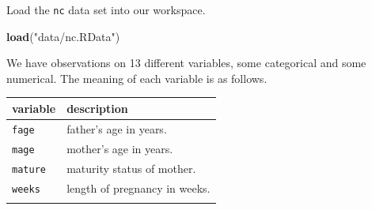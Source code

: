\documentclass[]{book}
\newenvironment{Shaded}{\begin{snugshade}}{\end{snugshade}}
\newcommand{\KeywordTok}[1]{\textcolor[rgb]{0.13,0.29,0.53}{\textbf{{#1}}}}
\newcommand{\StringTok}[1]{\textcolor[rgb]{0.31,0.60,0.02}{{#1}}}
\newcommand{\NormalTok}[1]{{#1}}
\theoremstyle{definition}
\theoremstyle{definition}
\theoremstyle{remark}
\begin{document}
Load the \texttt{nc} data set into our workspace.

\begin{Shaded}
\begin{Highlighting}[]
\KeywordTok{load}\NormalTok{(}\StringTok{"data/nc.RData"}\NormalTok{)}
\end{Highlighting}
\end{Shaded}

We have observations on 13 different variables, some categorical and
some numerical. The meaning of each variable is as follows.

\begin{longtable}[]{@{}ll@{}}
\toprule
\begin{minipage}[b]{0.22\columnwidth}\raggedright\strut
variable\strut
\end{minipage} & \begin{minipage}[b]{0.16\columnwidth}\raggedright\strut
description\strut
\end{minipage}\tabularnewline
\midrule
\endhead
\begin{minipage}[t]{0.22\columnwidth}\raggedright\strut
\texttt{fage}\strut
\end{minipage} & \begin{minipage}[t]{0.16\columnwidth}\raggedright\strut
father's age in years.\strut
\end{minipage}\tabularnewline
\begin{minipage}[t]{0.22\columnwidth}\raggedright\strut
\texttt{mage}\strut
\end{minipage} & \begin{minipage}[t]{0.16\columnwidth}\raggedright\strut
mother's age in years.\strut
\end{minipage}\tabularnewline
\begin{minipage}[t]{0.22\columnwidth}\raggedright\strut
\texttt{mature}\strut
\end{minipage} & \begin{minipage}[t]{0.16\columnwidth}\raggedright\strut
maturity status of mother.\strut
\end{minipage}\tabularnewline
\begin{minipage}[t]{0.22\columnwidth}\raggedright\strut
\texttt{weeks}\strut
\end{minipage} & \begin{minipage}[t]{0.16\columnwidth}\raggedright\strut
length of pregnancy in weeks.\strut
\end{minipage}\tabularnewline
\begin{minipage}[t]{0.22\columnwidth}\raggedright\strut

\end{minipage}
\end{longtable}
\end{document}
